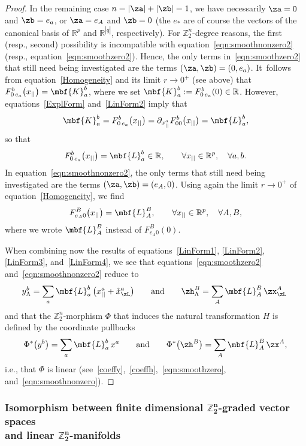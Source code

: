 \documentclass[pdftex]{sigma}%
\newcommand{\R}{{\mathbb R}}
\newcommand{\Z}{{\mathbb Z}}
\def\ul{\underline}
\def\ul{\underline}
\newcommand{\0}{\otimes}
\newcommand{\z}{\Z_2^n}
\numberwithin{equation}{section}
\begin{document}
\begin{proof}
In the remaining case $n=|\za|+|\zb|=1$, we have necessarily $\za=0$ and $\zb=e_a$, or $\za=e_A$ and $\zb=0$ (the $e_*$ are of course the vectors of the canonical basis of $\R^p$ and $\R^{|\ul q|}$, respectively). For $\z$-degree reasons, the first (resp., second) possibility is incompatible with equation~\eqref{eqn:smoothnonzero2} (resp., equation~\eqref{eqn:smoothzero2}). Hence, the only terms in~\eqref{eqn:smoothzero2} that still need being investigated are the terms $(\za,\zb)=(0,e_a)$. It~follows from equation~\eqref{Homogeneity} and its limit $r\to 0^+$ (see above) that $F_{0\,e_a}^b\big(x_{||}\big)=\mbf{K}^b_a$, where we set $\mbf{K}^b_a:=F^b_{0\,e_a}(0)\in\R$. However, equations~\eqref{ExplForm} and~\eqref{LinForm2} imply that
\[
\mbf{K}^b_a=F^b_{0\,e_a}\big(x_{||}\big)=\partial_{x_{||}^a}F^b_{00}\big(x_{||}\big)=\mbf{L}^b_a,
\]
so that
\begin{gather}\label{LinForm3}
F_{0\,e_a}^b\big(x_{||}\big)=\mbf{L}^b_a\in\R,\qquad
\forall x_{||}\in\R^p, \quad \forall a,b.
\end{gather}
In equation~\eqref{eqn:smoothnonzero2}, the only terms that still need being investigated are the terms $(\za,\zb)=(e_A,0)$. Using again the limit $r\to 0^+$ of equation~\eqref{Homogeneity}, we find
\begin{gather}\label{LinForm4}
F^B_{e_A 0}\big(x_{||}\big)=\mbf{L}^B_A,\qquad\forall x_{||}\in\R^p,\quad\forall A,B,
\end{gather}
where we wrote $\mbf{L}^B_A$ instead of $F^B_{e_A 0}(0)$.

When combining now the results of equations~\eqref{LinForm1}, \eqref{LinForm2}, \eqref{LinForm3}, and~\eqref{LinForm4}, we see that equations~\eqref{eqn:smoothzero2} and~\eqref{eqn:smoothnonzero2} reduce to \begin{gather*}
y^b_\Lambda = \sum_a\mbf{L}^b_a\, \big(x_{||}^a+\mathring{x}_{\zL}^a\big)\qquad\text{and}\qquad
\zh^B_\Lambda =\sum_A\mbf{L}^B_A \, \zx_\zL^A\;
\end{gather*}
and that the $\z$-morphism $\Phi$ that induces the natural transformation $H$ is defined by the coordinate pullbacks
\[
\Phi^*\big(y^b\big)= \sum_a\mbf{L}^b_a\, x^a\qquad\text{and}\qquad \Phi^*\big(\zh^B\big)=\sum_A\mbf{L}^B_A \, \zx^A,
\]
 i.e., that $\Phi$ is linear (see~\eqref{coeffy},~\eqref{coeffh},~\eqref{eqn:smoothzero}, and~\eqref{eqn:smoothnonzero}).\end{proof}

\subsubsection[Isomorphism between finite dimensional Z2n-graded vector spaces and linear Z2n-manifolds]
{Isomorphism between finite dimensional $\boldsymbol{\Z_2^n}$-graded vector spaces\\ and linear $\boldsymbol{\Z_2^n}$-manifolds}
\end{document}

